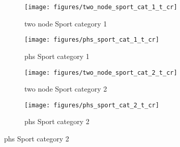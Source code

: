 \documentclass[11pt]{article}
\begin{document}
    \begin{figure}[htb!]
        \centering

        \begin{subfigure}{.5\textwidth}
            \centering
            \texttt{[image: figures/two\_node\_sport\_cat\_1\_t\_cr]}
            \caption{two node Sport category 1}\label{fig:two_node_sport_cat_1_t_cr}
        \end{subfigure}%
        \hfill
        \begin{subfigure}{.5\textwidth}
            \centering
            \texttt{[image: figures/phs\_sport\_cat\_1\_t\_cr]}
            \caption{phs Sport category 1}\label{fig:phs_sport_cat_1_t_cr}
        \end{subfigure}%
        \hfill
        \begin{subfigure}{.5\textwidth}
            \centering
            \texttt{[image: figures/two\_node\_sport\_cat\_2\_t\_cr]}
            \caption{two node Sport category 2}\label{fig:two_node_sport_cat_2_t_cr}
        \end{subfigure}%
        \hfill
        \begin{subfigure}{.5\textwidth}
            \centering
            \texttt{[image: figures/phs\_sport\_cat\_2\_t\_cr]}
            \caption{phs Sport category 2}\label{fig:phs_sport_cat_2_t_cr}
        \end{subfigure}%
        \hfill

    \end{figure}
\end{document}
